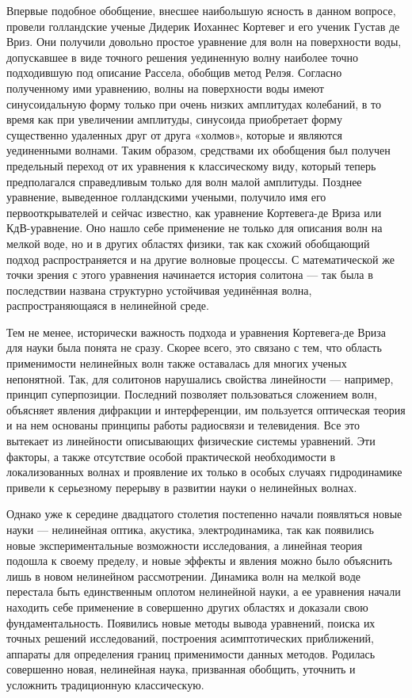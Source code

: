 Впервые подобное обобщение, внесшее наибольшую ясность в данном вопросе, провели \cite{korteweg1895xli} голландские ученые Дидерик Иоханнес Кортевег и его ученик Густав де Вриз. Они получили довольно простое уравнение для волн на поверхности воды, допускавшее в виде точного решения уединенную волну наиболее точно подходившую под описание Рассела, обобщив метод Релэя. Согласно полученному ими уравнению, волны на поверхности воды имеют синусоидальную форму только при очень низких амплитудах колебаний, в то время как при увеличении амплитуды, синусоида приобретает форму существенно удаленных друг от друга «холмов», которые и являются уединенными волнами. Таким образом, средствами их обобщения был получен предельный переход от их уравнения к классическому виду, который теперь предполагался справедливым только для волн малой амплитуды.
Позднее уравнение, выведенное голландскими учеными, получило имя его первооткрывателей и сейчас известно, как уравнение Кортевега-де Вриза или КдВ-уравнение. Оно нашло себе применение не только для описания волн на мелкой воде, но и в других областях физики, так как схожий обобщающий подход распространяется и на другие волновые процессы. С математической же точки зрения с этого уравнения начинается история солитона --- так была в последствии названа структурно устойчивая уединённая волна, распространяющаяся в нелинейной среде. 

Тем не менее, исторически важность подхода и уравнения Кортевега-де Вриза для науки была понята не сразу. Скорее всего, это связано с тем, что область применимости нелинейных волн также оставалась для многих ученых непонятной. Так, для солитонов нарушались свойства линейности --- например, принцип суперпозиции. Последний позволяет пользоваться сложением волн, объясняет явления дифракции и интерференции, им пользуется оптическая теория и на нем основаны принципы работы радиосвязи и телевидения. Все это вытекает из линейности описывающих физические системы уравнений. Эти факторы, а также отсутствие особой практической необходимости в локализованных волнах и проявление их только в особых случаях гидродинамике привели к серьезному перерыву в развитии науки о нелинейных волнах. 

Однако уже к середине двадцатого столетия постепенно начали появляться новые науки --- нелинейная оптика, акустика, электродинамика, так как появились новые экспериментальные возможности исследования, а линейная теория подошла к своему пределу, и новые эффекты и явления можно было объяснить лишь в новом нелинейном рассмотрении. Динамика волн на мелкой воде перестала быть единственным оплотом нелинейной науки, а ее уравнения начали находить себе применение в совершенно других областях и доказали свою фундаментальность. Появились новые методы вывода уравнений, поиска их точных решений исследований, построения асимптотических приближений, аппараты для определения границ применимости данных методов. Родилась совершенно новая, нелинейная наука, призванная обобщить, уточнить и усложнить традиционную классическую.

